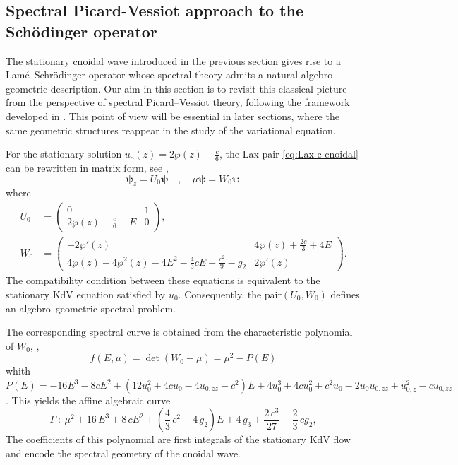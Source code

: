 \documentclass[a4paper,12pt]{article}
\begin{document}
\subsection{Spectral Picard-Vessiot  approach to the Sch\"odinger operator}\label{sec-B}

The stationary cnoidal wave introduced in the previous section gives rise to a Lam\'e–Schr\"odinger operator whose spectral theory admits a natural algebro–geo\-metric description. Our aim in this section is to revisit this classical picture from the perspective of spectral Picard–Vessiot theory, following the framework developed in \cite{MRZ2}. This point of view will be essential in later sections, where the same geometric structures reappear in the study of the variational equation.

For the stationary solution $u_o (z)= 2\wp(z)-\frac{c}{6}$, the Lax pair \eqref{eq:Lax-c-cnoidal} can be rewritten in matrix  form, see  \cite{GH}, 
\begin{equation} \label{eq:cn1LAXpair}
\bm\psi_z  =  U_0 {\bm\psi} \quad  , \quad \mu\bm\psi   =  W_0  \bm\psi \,
\end{equation}
where \begin{equation} 
 \begin{array}{ll}
 U_0 & =  \begin{pmatrix}0&1\\ 2\wp(z)-\frac c6-E&0\end{pmatrix}   , \\
 W_0  & =  \begin{pmatrix}-2\wp'(z)&4\wp(z)+\frac {2c}3 +4E\\
4\wp(z)-4\wp^2(z)-4E^2-\frac 43cE-\frac{c^2}9-g_2&2\wp'(z)\end{pmatrix}  .
\end{array}  
\end{equation}
The compatibility condition between these equations is equivalent to the stationary KdV equation satisfied by $u_0$. Consequently, the pair$(U_0 ,W_0)$ defines an algebro–geometric spectral problem.

The corresponding spectral curve is obtained from the characteristic polynomial of $W_0$,
  \cite{GH},
\begin{equation}\label{eq-Gamma}
  f( E,\mu )= \det (W_0 -\mu)= \mu^2 -P(E)  
\end{equation}
whith \(P(E)=-16E^3-8cE^2+(12u_0 ^2+4cu_0-4u_{0,zz}-c^2)E+4u_0^3 + 4cu_0^2 +  c^2 u_0 - 2u_0 u_{0,zz} + u_{0,z}^2- cu_{0,zz} \).
This yields the affine algebraic curve
\begin{equation}
\Gamma \ : \  {\mu}^{2}+16\,{E}^{3}+8\,c{E}^{2}+ \left( \frac43\,{c}^{2}-4\,{ g_2 } \right) E+4\,
{ g_3 }+{\frac {2\,{c}^{3}}{27}}-\frac23 \,c{ g_2 }  ,
\end{equation}
The coefficients of this polynomial are first integrals of the stationary KdV flow and encode the spectral geometry of the cnoidal wave.
\end{document}

